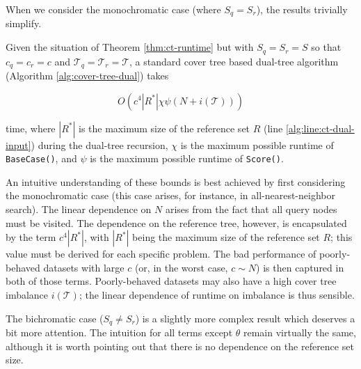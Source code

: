 When we consider the monochromatic case (where $S_q = S_r$), the results
trivially simplify.

\begin{cor}
\label{cor:ct-runtime-mono}
Given the situation of Theorem \ref{thm:ct-runtime} but with $S_q = S_r = S$ so
that $c_q = c_r = c$ and $\mathscr{T}_q = \mathscr{T}_r = \mathscr{T}$, a
standard cover tree based dual-tree algorithm (Algorithm
\ref{alg:cover-tree-dual}) takes

\begin{equation}
O\left(c^4 |R^*| \chi \psi (N + i(\mathscr{T}))\right)
\end{equation}

\noindent time, where $ | R^* | $ is the maximum size of the reference set $R$
(line \ref{alg:line:ct-dual-input}) during the dual-tree recursion, $\chi$ is
the maximum possible runtime of \texttt{BaseCase()}, and $\psi$ is the maximum
possible runtime of \texttt{Score()}.
\end{cor}

An intuitive understanding of these bounds is best achieved by first considering
the monochromatic case (this case arises, for instance, in all-nearest-neighbor
search).  The linear dependence on $N$ arises from the fact that all query nodes
must be visited.  The dependence on the reference tree, however, is encapsulated
by the term $c^4 |R^*|$, with $|R^*|$ being the maximum size of the reference
set $R$; this value must be derived for each specific problem.  The bad
performance of poorly-behaved datasets with large $c$ (or, in the worst case, $c
\sim N$) is then captured in both of those terms.  Poorly-behaved datasets may
also have a high cover tree imbalance $i(\mathscr{T})$; the linear dependence of
runtime on imbalance is thus sensible.

The bichromatic case ($S_q \ne S_r$) is a slightly more complex result which
deserves a bit more attention.  The intuition for all terms except $\theta$
remain virtually the same, although it is worth pointing out that there is
no dependence on the reference set size.

